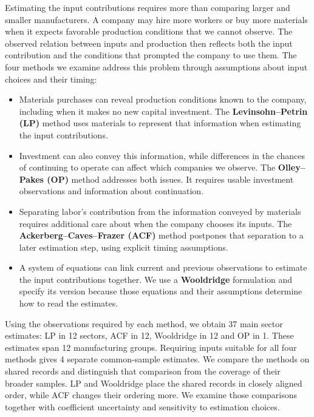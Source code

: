 Estimating the input contributions requires more than comparing larger and smaller manufacturers. A company may hire more workers or buy more materials when it expects favorable production conditions that we cannot observe. The observed relation between inputs and production then reflects both the input contribution and the conditions that prompted the company to use them. The four methods we examine address this problem through assumptions about input choices and their timing:
\begin{itemize}
\item Materials purchases can reveal production conditions known to the company, including when it makes no new capital investment. The \textbf{Levinsohn--Petrin (LP)} method uses materials to represent that information when estimating the input contributions.
\item Investment can also convey this information, while differences in the chances of continuing to operate can affect which companies we observe. The \textbf{Olley--Pakes (OP)} method addresses both issues. It requires usable investment observations and information about continuation.
\item Separating labor's contribution from the information conveyed by materials requires additional care about when the company chooses its inputs. The \textbf{Ackerberg--Caves--Frazer (ACF)} method postpones that separation to a later estimation step, using explicit timing assumptions.
\item A system of equations can link current and previous observations to estimate the input contributions together. We use a \textbf{Wooldridge} formulation and specify its version because those equations and their assumptions determine how to read the estimates.
\end{itemize}

Using the observations required by each method, we obtain 37 main sector estimates: LP in 12 sectors, ACF in 12, Wooldridge in 12 and OP in 1. These estimates span 12 manufacturing groups. Requiring inputs suitable for all four methods gives 4 separate common-sample estimates. We compare the methods on shared records and distinguish that comparison from the coverage of their broader samples. LP and Wooldridge place the shared records in closely aligned order, while ACF changes their ordering more. We examine those comparisons together with coefficient uncertainty and sensitivity to estimation choices.

